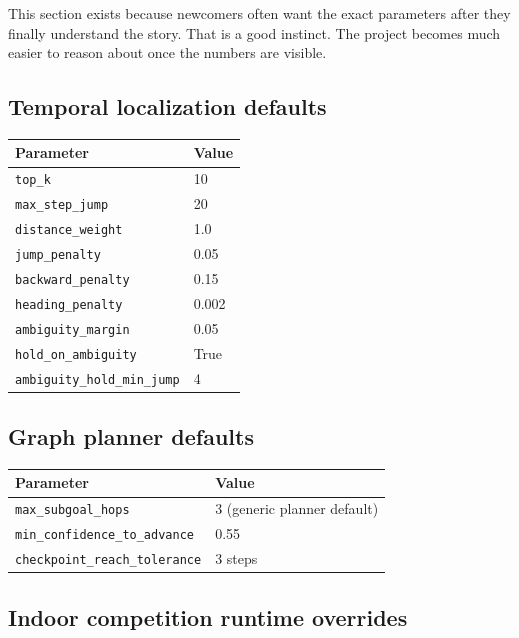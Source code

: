 \documentclass[11pt]{article}
\begin{document}
This section exists because newcomers often want the exact parameters after they
finally understand the story. That is a good instinct. The project becomes much
easier to reason about once the numbers are visible.

\subsection{Temporal localization defaults}

\begin{center}
\begin{tabular}{ll}
\toprule
\textbf{Parameter} & \textbf{Value} \\
\midrule
\texttt{top\_k} & 10 \\
\texttt{max\_step\_jump} & 20 \\
\texttt{distance\_weight} & 1.0 \\
\texttt{jump\_penalty} & 0.05 \\
\texttt{backward\_penalty} & 0.15 \\
\texttt{heading\_penalty} & 0.002 \\
\texttt{ambiguity\_margin} & 0.05 \\
\texttt{hold\_on\_ambiguity} & True \\
\texttt{ambiguity\_hold\_min\_jump} & 4 \\
\bottomrule
\end{tabular}
\end{center}

\subsection{Graph planner defaults}

\begin{center}
\begin{tabular}{ll}
\toprule
\textbf{Parameter} & \textbf{Value} \\
\midrule
\texttt{max\_subgoal\_hops} & 3 (generic planner default) \\
\texttt{min\_confidence\_to\_advance} & 0.55 \\
\texttt{checkpoint\_reach\_tolerance} & 3 steps \\
\bottomrule
\end{tabular}
\end{center}

\subsection{Indoor competition runtime overrides}
\end{document}
